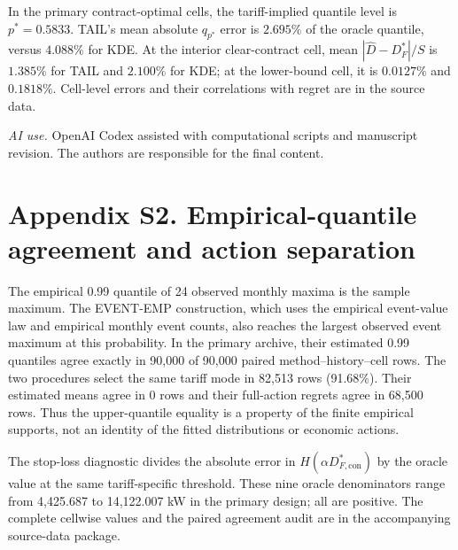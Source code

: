 \documentclass[]{interact}
\begin{document}

\FloatBarrier


\FloatBarrier


\FloatBarrier


\FloatBarrier


\FloatBarrier



\FloatBarrier


\FloatBarrier


\FloatBarrier
In the primary contract-optimal cells, the tariff-implied quantile
level is $p^*=0.5833$. TAIL's mean absolute $q_{p^*}$ error is
$2.695\%$ of the oracle quantile, versus $4.088\%$ for KDE. At the
interior clear-contract cell, mean $|\widehat D-D_F^*|/S$ is
$1.385\%$ for TAIL and $2.100\%$ for KDE; at the lower-bound cell,
it is $0.0127\%$ and $0.1818\%$. Cell-level errors and their
correlations with regret are in the source data.


\FloatBarrier

\FloatBarrier

\FloatBarrier

\FloatBarrier

\noindent\textit{AI use.} OpenAI Codex assisted with computational scripts and manuscript
revision. The authors are responsible for the final content.


\section*{Appendix S2. Empirical-quantile agreement and action separation}

The empirical 0.99 quantile of 24 observed monthly maxima is the
sample maximum. The EVENT-EMP construction, which uses the empirical
event-value law and empirical monthly event counts, also reaches the
largest observed event maximum at this probability. In the primary
archive, their estimated 0.99 quantiles agree exactly in
90,000 of 90,000
paired method--history--cell rows. The two procedures select the same
tariff mode in 82,513 rows
(91.68\%). Their estimated means
agree in 0 rows and their full-action regrets
agree in 68,500 rows. Thus the upper-quantile
equality is a property of the finite empirical supports, not an
identity of the fitted distributions or economic actions.

The stop-loss diagnostic divides the absolute error in
$H(\alpha D^*_{F,\mathrm{con}})$ by the oracle value at the same
tariff-specific threshold. These nine oracle denominators range from
4,425.687 to 14,122.007 kW in the primary design; all are positive.
The complete cellwise values and the paired agreement audit are in
the accompanying source-data package.
\end{document}
